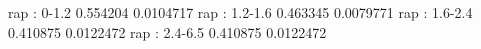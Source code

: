rap : 0-1.2
0.554204 0.0104717
rap : 1.2-1.6
0.463345 0.0079771
rap : 1.6-2.4
0.410875 0.0122472
rap : 2.4-6.5
0.410875 0.0122472

